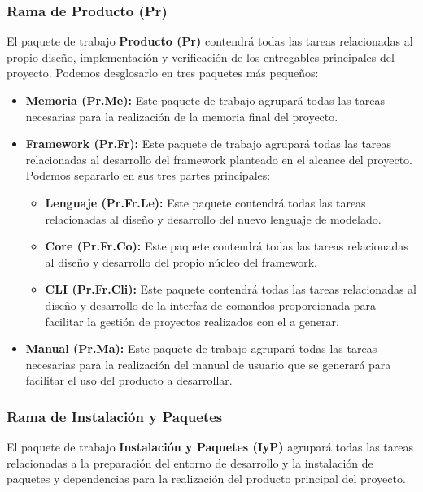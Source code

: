 \subsubsection{Rama de Producto (Pr)}
El paquete de trabajo \textbf{Producto (Pr)} contendrá todas las tareas
relacionadas al propio diseño, implementación y verificación de los entregables
principales del proyecto. Podemos desglosarlo en tres paquetes más pequeños:
\begin{itemize}
    \item \textbf{Memoria (Pr.Me):} Este paquete de trabajo agrupará todas las
    tareas necesarias para la realización de la memoria final del proyecto.
    \item \textbf{Framework (Pr.Fr):} Este paquete de trabajo agrupará todas las
    tareas relacionadas al desarrollo del framework planteado en el alcance del
    proyecto. Podemos separarlo en sus tres partes principales:
    \begin{itemize}
        \item \textbf{Lenguaje (Pr.Fr.Le):} Este paquete contendrá todas las
        tareas relacionadas al diseño y desarrollo del nuevo lenguaje de
        modelado.
        \item \textbf{Core (Pr.Fr.Co):} Este paquete contendrá todas las
        tareas relacionadas al diseño y desarrollo del propio núcleo del
        framework.
        \item \textbf{CLI (Pr.Fr.Cli):} Este paquete contendrá todas las
        tareas relacionadas al diseño y desarrollo de la interfaz de comandos
        proporcionada para facilitar la gestión de proyectos realizados con el
        a generar. 
    \end{itemize}
    \item \textbf{Manual (Pr.Ma):} Este paquete de trabajo agrupará todas las
    tareas necesarias para la realización del manual de usuario que se generará
    para facilitar el uso del producto a desarrollar.
\end{itemize}

\subsubsection{Rama de Instalación y Paquetes}
El paquete de trabajo \textbf{Instalación y Paquetes (IyP)} agrupará todas las
tareas relacionadas a la preparación del entorno de desarrollo y la instalación
de paquetes y dependencias para la realización del producto principal del
proyecto.